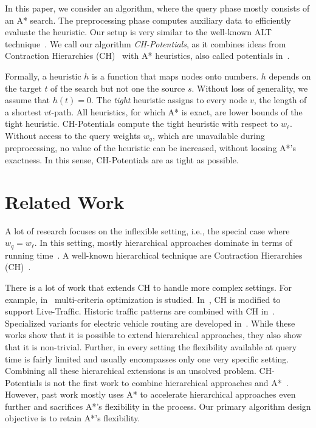 \documentclass[letterpaper]{article} %
\begin{document}
In this paper, we consider an algorithm, where the query phase mostly consists of an A* search.
The preprocessing phase computes auxiliary data to efficiently evaluate the heuristic.
Our setup is very similar to the well-known ALT technique~\cite{gh-cspas-05,DBLP:conf/wea/DellingW07}.
We call our algorithm \emph{CH-Potentials}, as it combines ideas from Contraction Hierarchies (CH)~\cite{gssv-erlrn-12} with A* heuristics, also called potentials in~\cite{gh-cspas-05}.

Formally, a heuristic $h$ is a function that maps nodes onto numbers.
$h$ depends on the target $t$ of the search but not one the source $s$.
Without loss of generality, we assume that $h(t)=0$.
The \emph{tight} heuristic assigns to every node $v$, the length of a shortest $vt$-path.
All heuristics, for which A* is exact, are lower bounds of the tight heuristic.
CH-Potentials compute the tight heuristic with respect to $w_\ell$.
Without access to the query weights $w_q$, which are unavailable during preprocessing, no value of the heuristic can be increased, without loosing A*'s exactness.
In this sense, CH-Potentials are as tight as possible.

\section{Related Work}

A lot of research focuses on the inflexible setting, i.e., the special case where $w_q = w_\ell$.
In this setting, mostly hierarchical approaches dominate in terms of running time~\cite{bdgmpsww-rptn-16}.
A well-known hierarchical technique are Contraction Hierarchies (CH)~\cite{gssv-erlrn-12}.

There is a lot of work that extends CH to handle more complex settings.
For example, in~\cite{fns-opca-14,gks-rpfof-10} multi-criteria optimization is studied.
In~\cite{dsw-cch-15}, CH is modified to support Live-Traffic.
Historic traffic patterns are combined with CH in~\cite{swz-sfert-19,bgsv-mtdtt-13,bdpw-dtdrp-16}.
Specialized variants for electric vehicle routing are developed in~\cite{bdgwz-sfpcs-19}.
While these works show that it is possible to extend hierarchical approaches, they also show that it is non-trivial.
Further, in every setting the flexibility available at query time is fairly limited and usually encompasses only one very specific setting.
Combining all these hierarchical extensions is an unsolved problem.
%
CH-Potentials is not the first work to combine hierarchical approaches and A*~\cite{bdsssw-chgds-10,gkw-blwr-07,bdgwz-sfpcs-19}.
However, past work mostly uses A* to accelerate hierarchical approaches even further and sacrifices A*'s flexibility in the process.
Our primary algorithm design objective is to retain A*'s flexibility.
\end{document}
